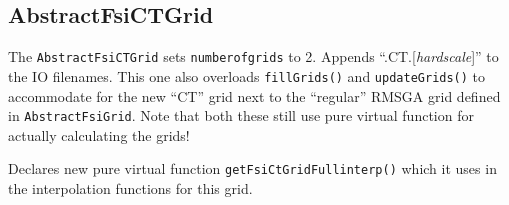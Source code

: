 \subsection{AbstractFsiCTGrid}
The \texttt{AbstractFsiCTGrid} sets \texttt{number\textunderscore of\textunderscore grids} to 2. Appends ``.CT.[\textit{hardscale}]'' to the IO filenames.
This one also overloads \texttt{fillGrids()} and \texttt{updateGrids()} to accommodate for the new ``CT'' grid next to the ``regular'' RMSGA grid defined in \texttt{AbstractFsiGrid}. Note that both these still use pure virtual function for actually calculating the grids!

Declares new pure virtual function \texttt{getFsiCtGridFull\textunderscore interp()} which it uses in the interpolation functions for this grid.